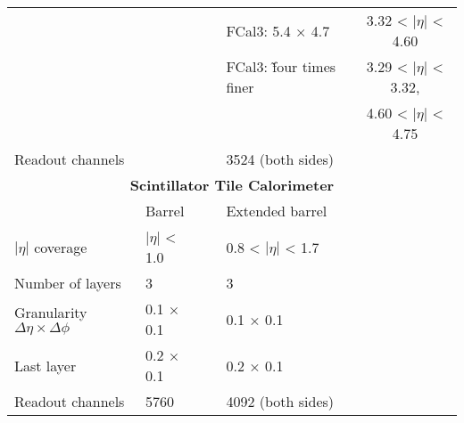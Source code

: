 \begin{table}[]
\begin{tabular}{|l|lc|lc|}
                                               &                   &                                    & FCal3: 5.4 × 4.7                & 3.32 < $|\eta|$ < 4.60   \\
                                               &                   &                                    & FCal3: \~ four times finer       & 3.29 < $|\eta|$ < 3.32,  \\
                                               &                   &                                    &                                 & 4.60 < $|\eta|$ < 4.75   \\
\hline 
Readout channels                               &                   &                                    & 3524 (both sides)               &                                     \\
\hline 
                                               \multicolumn{5}{|c|}{\textbf{Scintillator Tile Calorimeter}} \\
\hline 
                                               & Barrel            &                                    & Extended barrel                 &                                     \\
\hline 
$|\eta|$ coverage                              &    $|\eta|$ < 1.0 &                                    & 0.8 < $|\eta|$ < 1.7 &                                     \\
Number of layers                               & 3                 &                                    & 3                               &                                     \\
\hline 
Granularity $\Delta \eta \times \Delta \phi$   & 0.1 × 0.1         &                                    & 0.1 × 0.1                       &                                     \\
Last layer                                     & 0.2 × 0.1         &                                    & 0.2 × 0.1                       &                                     \\
\hline 
Readout channels                               & 5760              &                                    & 4092 (both sides)               &                                    \\
\hline 
\end{tabular} \end{table}
